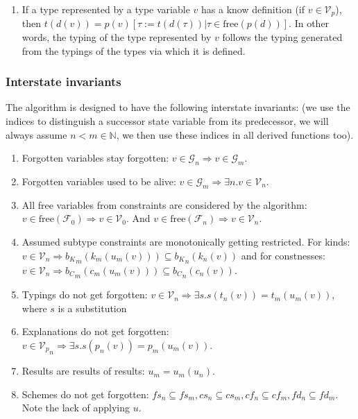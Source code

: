 \begin{enumerate}
    \item If a type represented by a type variable $v$ has a know definition (if $v \in \mathcal{V}_p$), then $t (d (v)) = p(v) \left[ \tau := t (d (\tau)) | \tau \in \mathrm{free} (p (d))\right]$. In other words, the typing of the type represented by $v$ follows the typing generated from the typings of the types via which it is defined. \label{invT}
\end{enumerate}

\subsubsection{Interstate invariants}

The algorithm is designed to have the following interstate invariants: (we use the indices to distinguish a successor state variable from its predecessor, we will always assume $n < m \in \mathbb{N}$, we then use these indices in all derived functions too).

\begin{enumerate}
    \item Forgotten variables stay forgotten: $v \in \mathcal{G}_n \Rightarrow v \in \mathcal{G}_m$.
    \item Forgotten variables used to be alive: $v \in \mathcal{G}_m \Rightarrow \exists n . v \in \mathcal{V}_n$.
    \item All free variables from constraints are considered by the algorithm: $v \in \mathrm{free} (\mathcal{F}_0) \Rightarrow v \in \mathcal{V}_0$. And $v \in \mathrm{free} (\mathcal{F}_n) \Rightarrow v \in \mathcal{V}_n$.
    \item Assumed subtype constraints are monotonically getting restricted. For kinds: $v \in {\mathcal{V}}_n \Rightarrow {b_K}_m (k_m(u_m(v))) \subseteq {b_K}_n (k_n(v))$ and for constnesses: $v \in {\mathcal{V}}_n \Rightarrow {b_C}_m (c_m(u_m(v))) \subseteq {b_C}_n (c_n(v))$.
    \item Typings do not get forgotten: $v \in {\mathcal{V}}_n \Rightarrow \exists s . s(t_n(v)) = t_m(u_m (v))$, where $s$ is a substitution
    \item Explanations do not get forgotten: $v \in {\mathcal{V}_p}_n \Rightarrow \exists s . s(p_n(v)) = p_m(u_m (v))$.
    \item Results are results of results: $u_m = u_m (u_n)$.
    \item Schemes do not get forgotten: $fs_n \subseteq fs_m, cs_n \subseteq cs_m, cf_n \subseteq  cf_m, fd_n \subseteq  fd_m$. Note the lack of applying $u$.
\end{enumerate}

